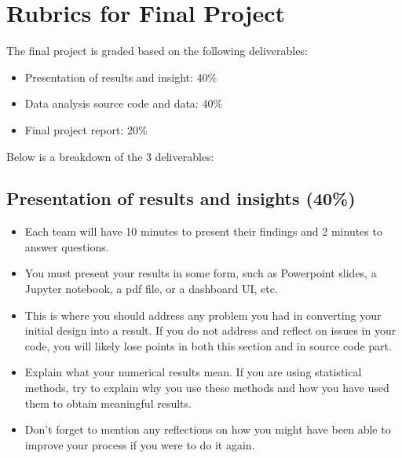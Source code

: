 \documentclass[11pt]{article}
\begin{document}

\section*{Rubrics for Final Project}

\setlength{\parindent}{0pt}

The final project is graded based on the following deliverables:
\begin{itemize}
	\item Presentation of results and insight: 40\%
	\item Data analysis source code and data: 40\%
	\item Final project report: 20\%
\end{itemize}

Below is a breakdown of the 3 deliverables:

\subsection{Presentation of results and insights (40\%)}
\begin{itemize}
	\item Each team will have 10 minutes to present their findings and 2 minutes to answer questions.
	\item You must present your results in some form, such as Powerpoint slides, a Jupyter notebook, a pdf file, or a dashboard UI, etc.
	\item This is where you should address any problem you had in converting
	your initial design into a result. If you do not address and reflect on issues in your code, you will likely lose points in both this section and in source code part.
	\item Explain what your numerical results mean. If you are using statistical methods, try to explain why you use these methods and how you have used them to obtain meaningful results.
	\item Don’t forget to mention any reflections on how you might have been able to improve your process if you were to do it again.	
\end{itemize}	
\end{document}
